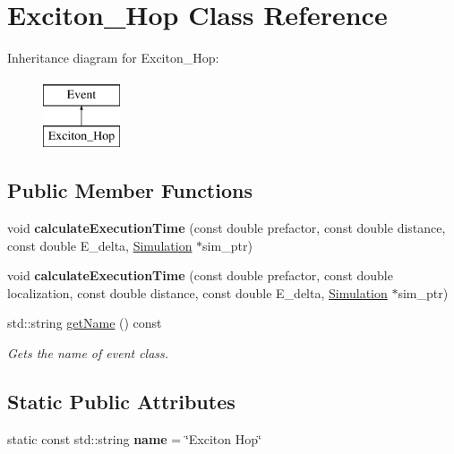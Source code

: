 \hypertarget{class_exciton___hop}{}\section{Exciton\+\_\+\+Hop Class Reference}
\label{class_exciton___hop}
Inheritance diagram for Exciton\+\_\+\+Hop\+:\begin{figure}[H]
\begin{center}
\leavevmode
\includegraphics[height=2.000000cm]{class_exciton___hop}
\end{center}
\end{figure}
\subsection*{Public Member Functions}
\begin{DoxyCompactItemize}
\item 
\mbox{\label{class_exciton___hop_a592dffe088b974fc5c6e12629c97b4df}} 
void {\bfseries calculate\+Execution\+Time} (const double prefactor, const double distance, const double E\+\_\+delta, \hyperlink{class_simulation}{Simulation} $\ast$sim\+\_\+ptr)
\item 
\mbox{\label{class_exciton___hop_abcdc64e255936380a8437a048a81b75b}} 
void {\bfseries calculate\+Execution\+Time} (const double prefactor, const double localization, const double distance, const double E\+\_\+delta, \hyperlink{class_simulation}{Simulation} $\ast$sim\+\_\+ptr)
\item 
std\+::string \hyperlink{class_exciton___hop_a8e08c3992b06fa0efe7db438a381445b}{get\+Name} () const
\begin{DoxyCompactList}\small\item\em Gets the name of event class. \end{DoxyCompactList}\end{DoxyCompactItemize}
\subsection*{Static Public Attributes}
\begin{DoxyCompactItemize}
\item 
\mbox{\label{class_exciton___hop_abdb3ad0035448cdb55215a4f641b2150}} 
static const std\+::string {\bfseries name} = \char`\"{}Exciton Hop\char`\"{}
\end{DoxyCompactItemize}


